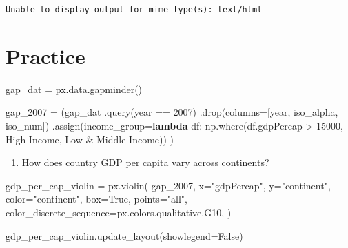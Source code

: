 \documentclass[
  letterpaper,
  DIV=11,
  numbers=noendperiod]{scrreprt}
\newenvironment{Shaded}{\begin{snugshade}}{\end{snugshade}}
\newcommand{\DecValTok}[1]{\textcolor[rgb]{0.68,0.00,0.00}{#1}}
\newcommand{\KeywordTok}[1]{\textcolor[rgb]{0.00,0.23,0.31}{\textbf{#1}}}
\newcommand{\NormalTok}[1]{\textcolor[rgb]{0.00,0.23,0.31}{#1}}
\newcommand{\OperatorTok}[1]{\textcolor[rgb]{0.37,0.37,0.37}{#1}}
\newcommand{\StringTok}[1]{\textcolor[rgb]{0.13,0.47,0.30}{#1}}
\newcommand{\VariableTok}[1]{\textcolor[rgb]{0.07,0.07,0.07}{#1}}
\providecommand{\tightlist}{%
  \setlength{\itemsep}{0pt}\setlength{\parskip}{0pt}}\usepackage{longtable,booktabs,array}
\begin{document}
\begin{verbatim}
Unable to display output for mime type(s): text/html
\end{verbatim}

\chapter{Practice}\label{practice-1}

\begin{Shaded}
\begin{Highlighting}[]
\NormalTok{gap\_dat }\OperatorTok{=}\NormalTok{ px.data.gapminder()}

\NormalTok{gap\_2007 }\OperatorTok{=}\NormalTok{ (gap\_dat}
\NormalTok{    .query(}\StringTok{\textquotesingle{}year == 2007\textquotesingle{}}\NormalTok{)}
\NormalTok{    .drop(columns}\OperatorTok{=}\NormalTok{[}\StringTok{\textquotesingle{}year\textquotesingle{}}\NormalTok{, }\StringTok{\textquotesingle{}iso\_alpha\textquotesingle{}}\NormalTok{, }\StringTok{\textquotesingle{}iso\_num\textquotesingle{}}\NormalTok{])}
\NormalTok{    .assign(income\_group}\OperatorTok{=}\KeywordTok{lambda}\NormalTok{ df: np.where(df.gdpPercap }\OperatorTok{\textgreater{}} \DecValTok{15000}\NormalTok{, }\StringTok{\textquotesingle{}High Income\textquotesingle{}}\NormalTok{, }\StringTok{\textquotesingle{}Low \& Middle Income\textquotesingle{}}\NormalTok{))}
\NormalTok{)}
\end{Highlighting}
\end{Shaded}

\begin{enumerate}
\def\labelenumi{\arabic{enumi}.}
\tightlist
\item
  How does country GDP per capita vary across continents?
\end{enumerate}

\begin{Shaded}
\begin{Highlighting}[]
\NormalTok{gdp\_per\_cap\_violin }\OperatorTok{=}\NormalTok{ px.violin(}
\NormalTok{    gap\_2007,}
\NormalTok{    x}\OperatorTok{=}\StringTok{"gdpPercap"}\NormalTok{,}
\NormalTok{    y}\OperatorTok{=}\StringTok{"continent"}\NormalTok{,}
\NormalTok{    color}\OperatorTok{=}\StringTok{"continent"}\NormalTok{,}
\NormalTok{    box}\OperatorTok{=}\VariableTok{True}\NormalTok{,}
\NormalTok{    points}\OperatorTok{=}\StringTok{"all"}\NormalTok{,}
\NormalTok{    color\_discrete\_sequence}\OperatorTok{=}\NormalTok{px.colors.qualitative.G10,}
\NormalTok{)}

\NormalTok{gdp\_per\_cap\_violin.update\_layout(showlegend}\OperatorTok{=}\VariableTok{False}\NormalTok{)}
\end{Highlighting}
\end{Shaded}
\end{document}
